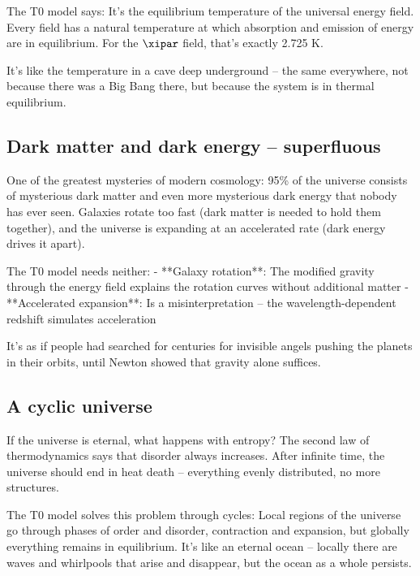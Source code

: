 	The T0 model says: It's the equilibrium temperature of the universal energy field. Every field has a natural temperature at which absorption and emission of energy are in equilibrium. For the $\xipar$ field, that's exactly 2.725 K.
	
	It's like the temperature in a cave deep underground -- the same everywhere, not because there was a Big Bang there, but because the system is in thermal equilibrium.
	
	\subsection{Dark matter and dark energy -- superfluous}
	
	One of the greatest mysteries of modern cosmology: 95\% of the universe consists of mysterious dark matter and even more mysterious dark energy that nobody has ever seen. Galaxies rotate too fast (dark matter is needed to hold them together), and the universe is expanding at an accelerated rate (dark energy drives it apart).
	
	The T0 model needs neither:
	- **Galaxy rotation**: The modified gravity through the energy field explains the rotation curves without additional matter
	- **Accelerated expansion**: Is a misinterpretation -- the wavelength-dependent redshift simulates acceleration
	
	It's as if people had searched for centuries for invisible angels pushing the planets in their orbits, until Newton showed that gravity alone suffices.
	
	\subsection{A cyclic universe}
	
	If the universe is eternal, what happens with entropy? The second law of thermodynamics says that disorder always increases. After infinite time, the universe should end in heat death -- everything evenly distributed, no more structures.
	
	The T0 model solves this problem through cycles: Local regions of the universe go through phases of order and disorder, contraction and expansion, but globally everything remains in equilibrium. It's like an eternal ocean -- locally there are waves and whirlpools that arise and disappear, but the ocean as a whole persists.
	